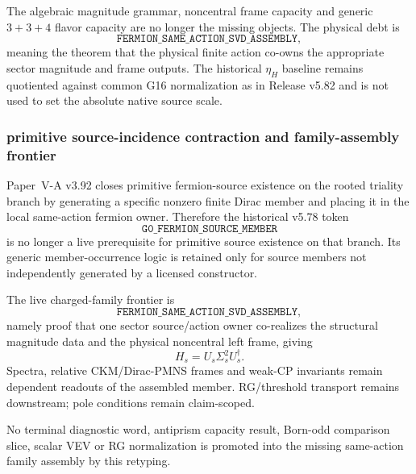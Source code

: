 \documentclass[12pt,a4paper]{article}
\begin{document}
\begin{remark}
\label{p6:rem:v583-live-family-frontier}
The algebraic magnitude grammar, noncentral frame capacity and generic
$3+3+4$ flavor capacity are no longer the missing objects.  The physical
debt is
\[
 \boxed{\texttt{FERMION\_SAME\_ACTION\_SVD\_ASSEMBLY}},
\]
meaning the theorem that the physical finite action co-owns the appropriate
sector magnitude and frame outputs.  The historical $\eta_H$ baseline remains
quotiented against common G16 normalization as in Release v5.82 and is not
used to set the absolute native source scale.
\end{remark}


\subsubsection*{primitive source-incidence contraction and family-assembly frontier}
\label{p6:sec:v584-rooted-source-handoff}

Paper~V-A v3.92 closes primitive fermion-source existence on the rooted
triality branch by generating a specific nonzero finite Dirac member and
placing it in the local same-action fermion owner.  Therefore the historical
v5.78 token
\[
 \texttt{G0\_FERMION\_SOURCE\_MEMBER}
\]
is no longer a live prerequisite for primitive source existence on that
branch.  Its generic member-occurrence logic is retained only for source
members not independently generated by a licensed constructor.

The live charged-family frontier is
\[
 \boxed{\texttt{FERMION\_SAME\_ACTION\_SVD\_ASSEMBLY}},
\]
namely proof that one sector source/action owner co-realizes the structural
magnitude data and the physical noncentral left frame, giving
\[
 \boxed{H_s=U_s\Sigma_s^2U_s^\dagger.}
\]
Spectra, relative CKM/Dirac-PMNS frames and weak-CP invariants remain dependent
readouts of the assembled member.  RG/threshold transport remains downstream;
pole conditions remain claim-scoped.

No terminal diagnostic word, antiprism capacity result, Born-odd comparison
slice, scalar VEV or RG normalization is promoted into the missing same-action
family assembly by this retyping.


\setcounter{section}{0}
\renewcommand{\thesection}{A\Alph{section}}
\renewcommand{\theHsection}{extended.\arabic{section}}
\end{document}
